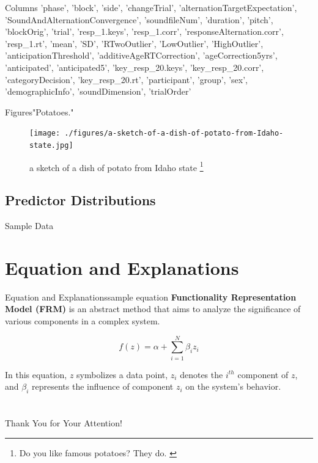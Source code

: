 \documentclass[
]{beamer}
\begin{document}
\begin{frame}{Columns}
'phase',
 'block',
 'side',
 'changeTrial',
 'alternationTargetExpectation',
 'SoundAndAlternationConvergence',
 'soundfileNum',
 'duration',
 'pitch',
 'blockOrig',
 'trial',
 'resp_1.keys',
 'resp_1.corr',
 'responseAlternation.corr',
 'resp_1.rt',
 'mean',
 'SD',
 'RTwoOutlier',
 'LowOutlier',
 'HighOutlier',
 'anticipationThreshold',
 'additiveAgeRTCorrection',
 'ageCorrection5yrs',
 'anticipated',
 'anticipated5',
 'key_resp_20.keys',
 'key_resp_20.corr',
 'categoryDecision',
 'key_resp_20.rt',
 'participant',
 'group',
 'sex',
 'demographicInfo',
 'soundDimension',
 'trialOrder'
\end{frame}


\begin{frame}{Figures}{"Potatoes."}

\begin{figure}
    \texttt{[image: ./figures/a-sketch-of-a-dish-of-potato-from-Idaho-state.jpg]}
      \caption{a sketch of a dish of potato from Idaho state%
        \footnote{%
          Do you like famous potatoes?
          They do.
          \cite{evelyn1984potatoes}
        }%
      }

\end{figure}
\end{frame}


\subsection[Short Subsection 3 Name]{Predictor Distributions}


\begin{frame}{Sample Data}

\end{frame}


\section[Equation]{Equation and Explanations}

\begin{frame}{Equation and Explanations}{sample equation}
\textbf{Functionality Representation Model (FRM)} is an abstract method that aims to analyze the significance of various components in a complex system.

$$f(z) = \alpha + \sum^{N}_{i=1}\beta_iz_i$$

In this equation, $z$ symbolizes a data point, $z_i$ denotes the $i^{th}$ component of $z$, and $\beta_i$ represents the influence of component $z_i$ on the system's behavior.
    
\end{frame}

\section{\bibname}
\begin{frame}[t, allowframebreaks]{\bibname}
\printbibliography[heading=none]
\end{frame}




\begin{frame}%
\vfill
\centerline{Thank You for Your Attention!}
\vfill\vfill
\end{frame}
%
\end{document}
